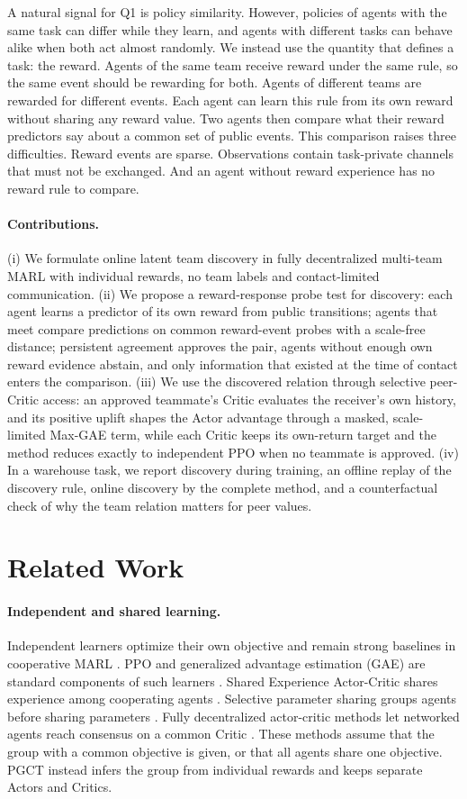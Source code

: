 \documentclass{article}
\begin{document}
A natural signal for Q1 is policy similarity. However, policies of agents with the same task can differ while they learn, and agents with different tasks can behave alike when both act almost randomly. We instead use the quantity that defines a task: the reward. Agents of the same team receive reward under the same rule, so the same event should be rewarding for both. Agents of different teams are rewarded for different events. Each agent can learn this rule from its own reward without sharing any reward value. Two agents then compare what their reward predictors say about a common set of public events. This comparison raises three difficulties. Reward events are sparse. Observations contain task-private channels that must not be exchanged. And an agent without reward experience has no reward rule to compare.

\paragraph{Contributions.} (i) We formulate online latent team discovery in fully decentralized multi-team MARL with individual rewards, no team labels and contact-limited communication. (ii) We propose a reward-response probe test for discovery: each agent learns a predictor of its own reward from public transitions; agents that meet compare predictions on common reward-event probes with a scale-free distance; persistent agreement approves the pair, agents without enough own reward evidence abstain, and only information that existed at the time of contact enters the comparison. (iii) We use the discovered relation through selective peer-Critic access: an approved teammate's Critic evaluates the receiver's own history, and its positive uplift shapes the Actor advantage through a masked, scale-limited Max-GAE term, while each Critic keeps its own-return target and the method reduces exactly to independent PPO when no teammate is approved. (iv) In a warehouse task, we report discovery during training, an offline replay of the discovery rule, online discovery by the complete method, and a counterfactual check of why the team relation matters for peer values.

\section{Related Work}
\paragraph{Independent and shared learning.}
Independent learners optimize their own objective and remain strong baselines in cooperative MARL \cite{tan,ippo,benchmark}. PPO and generalized advantage estimation (GAE) are standard components of such learners \cite{ppo,gae,mappo}. Shared Experience Actor-Critic shares experience among cooperating agents \cite{seac}. Selective parameter sharing groups agents before sharing parameters \cite{seps}. Fully decentralized actor-critic methods let networked agents reach consensus on a common Critic \cite{fdmarl}. These methods assume that the group with a common objective is given, or that all agents share one objective. PGCT instead infers the group from individual rewards and keeps separate Actors and Critics.
\end{document}

